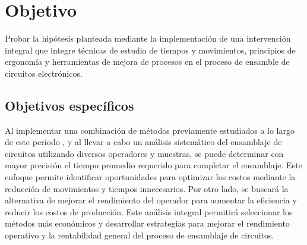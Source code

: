     \section{Objetivo}
    
    Probar la hipótesis planteada mediante la implementación de una intervención integral que integre técnicas de estudio de tiempos y movimientos, principios de ergonomía y herramientas de mejora de procesos en el proceso de ensamble de circuitos electrónicos.
    \subsection{Objetivos específicos}
    
    Al implementar una combinación de métodos previamente estudiados a lo largo de este período , y al llevar a cabo un análisis sistemático del ensamblaje de circuitos utilizando diversos operadores y muestras, se puede determinar con mayor precisión el tiempo promedio requerido para completar el ensamblaje. Este enfoque permite identificar oportunidades para optimizar los costos mediante la reducción de movimientos y tiempos innecesarios. Por otro lado, se buscará la alternativa de  mejorar el rendimiento del operador para aumentar la eficiencia y reducir los costos de producción. Este análisis integral permitirá seleccionar los métodos más económicos y desarrollar estrategias para mejorar el rendimiento operativo y la rentabilidad general del proceso de ensamblaje de circuitos.
    
